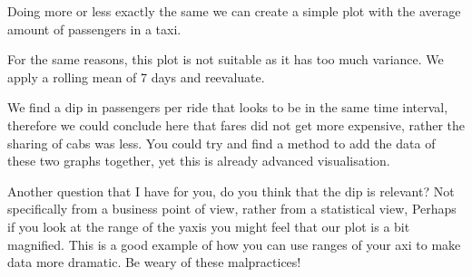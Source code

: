 \documentclass[letterpaper,10pt,english]{jupyterBook}
\begin{document}
\sphinxAtStartPar
Doing more or less exactly the same we can create a simple plot with the average amount of passengers in a taxi.

\begin{sphinxVerbatim}[commandchars=\\\{\}]
  \PYG{p}{[}\PYG{p}{]}
   
\end{sphinxVerbatim}

\noindent{}

\sphinxAtStartPar
For the same reasons, this plot is not suitable as it has too much variance.
We apply a rolling mean of 7 days and re\sphinxhyphen{}evaluate.

\begin{sphinxVerbatim}[commandchars=\\\{\}]
  
   
\end{sphinxVerbatim}

\noindent{}

\sphinxAtStartPar
We find a dip in passengers per ride that looks to be in the same time interval, therefore we could conclude here that fares did not get more expensive, rather the sharing of cabs was less.
You could try and find a method to add the data of these two graphs together, yet this is already advanced visualisation.

\sphinxAtStartPar
Another question that I have for you, do you think that the dip is relevant? Not specifically from a business point of view, rather from a statistical view, Perhaps if you look at the range of the y\sphinxhyphen{}axis you might feel that our plot is a bit magnified. This is a good example of how you can use ranges of your axi to make data more dramatic. Be weary of these malpractices!
\end{document}
